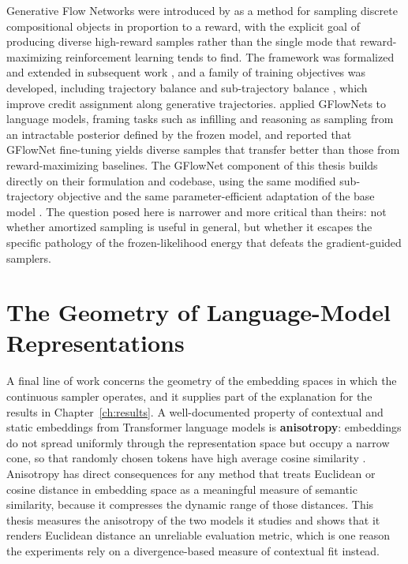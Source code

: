 Generative Flow Networks were introduced by \citet{bengio2021flow} as a method for sampling discrete compositional objects in proportion to a reward, with the explicit goal of producing diverse high-reward samples rather than the single mode that reward-maximizing reinforcement learning tends to find. The framework was formalized and extended in subsequent work \citep{bengio2023gflownet}, and a family of training objectives was developed, including trajectory balance \citep{malkin2022trajectory} and sub-trajectory balance \citep{madan2023learning}, which improve credit assignment along generative trajectories. \citet{hu2024amortizing} applied GFlowNets to language models, framing tasks such as infilling and reasoning as sampling from an intractable posterior defined by the frozen model, and reported that GFlowNet fine-tuning yields diverse samples that transfer better than those from reward-maximizing baselines. The GFlowNet component of this thesis builds directly on their formulation and codebase, using the same modified sub-trajectory objective and the same parameter-efficient adaptation of the base model \citep{hu2022lora}. The question posed here is narrower and more critical than theirs: not whether amortized sampling is useful in general, but whether it escapes the specific pathology of the frozen-likelihood energy that defeats the gradient-guided samplers.

\section{The Geometry of Language-Model Representations}
\label{sec:rel-geometry}

A final line of work concerns the geometry of the embedding spaces in which the continuous sampler operates, and it supplies part of the explanation for the results in Chapter~\ref{ch:results}. A well-documented property of contextual and static embeddings from Transformer language models is \textbf{anisotropy}: embeddings do not spread uniformly through the representation space but occupy a narrow cone, so that randomly chosen tokens have high average cosine similarity \citep{gao2019representation, ethayarajh2019contextual}. Anisotropy has direct consequences for any method that treats Euclidean or cosine distance in embedding space as a meaningful measure of semantic similarity, because it compresses the dynamic range of those distances. This thesis measures the anisotropy of the two models it studies and shows that it renders Euclidean distance an unreliable evaluation metric, which is one reason the experiments rely on a divergence-based measure of contextual fit instead.

